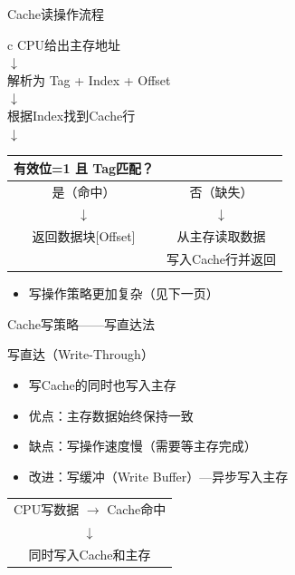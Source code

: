 \documentclass[10pt, aspectratio=169]{beamer}
\begin{document}
\begin{frame}{Cache读操作流程}
    \begin{center}
        \begin{tabular}{c}
            CPU给出主存地址 \\
            $\downarrow$ \\
            解析为 Tag + Index + Offset \\
            $\downarrow$ \\
            根据Index找到Cache行 \\
            $\downarrow$ \\
            \begin{tabular}{c|c}
                有效位=1 且 Tag匹配？ & \\
                \hline
                是（命中） & 否（缺失） \\
                $\downarrow$ & $\downarrow$ \\
                返回数据块[Offset] & 从主存读取数据 \\
                                  & 写入Cache行并返回 \\
            \end{tabular}
        \end{tabular}
    \end{center}
    \vspace{0.3em}
    \begin{itemize}
        \item 写操作策略更加复杂（见下一页）
    \end{itemize}
\end{frame}

\begin{frame}{Cache写策略——写直达法}
    \begin{block}{写直达（Write-Through）}
        \begin{itemize}
            \item 写Cache的同时也写入主存
            \item 优点：主存数据始终保持一致
            \item 缺点：写操作速度慢（需要等主存完成）
            \item 改进：写缓冲（Write Buffer）—异步写入主存
        \end{itemize}
    \end{block}
    \vspace{0.5em}
    \begin{center}
        \begin{tabular}{c}
            CPU写数据 $\to$ Cache命中 \\
            $\downarrow$ \\
            同时写入Cache和主存 \\
        \end{tabular}
    \end{center}
\end{frame}
\end{document}
